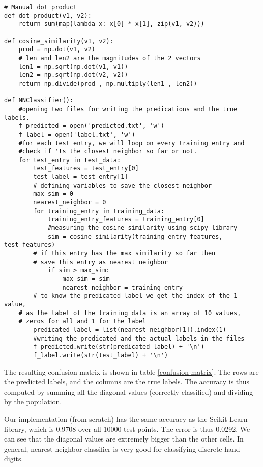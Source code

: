 \begin{lstlisting}[frame=single]
# Manual dot product
def dot_product(v1, v2):
    return sum(map(lambda x: x[0] * x[1], zip(v1, v2)))

def cosine_similarity(v1, v2):
    prod = np.dot(v1, v2)
    # len and len2 are the magnitudes of the 2 vectors
    len1 = np.sqrt(np.dot(v1, v1))
    len2 = np.sqrt(np.dot(v2, v2))
    return np.divide(prod , np.multiply(len1 , len2))

def NNClassifier():
    #opening two files for writing the predications and the true labels.
    f_predicted = open('predicted.txt', 'w')
    f_label = open('label.txt', 'w')
    #for each test entry, we will loop on every training entry and 
    #check if 'ts the closest neighbor so far or not.
    for test_entry in test_data:
        test_features = test_entry[0]    
        test_label = test_entry[1]
        # defining variables to save the closest neighbor
        max_sim = 0  
        nearest_neighbor = 0 
        for training_entry in training_data:
            training_entry_features = training_entry[0]
            #measuring the cosine similarity using scipy library
            sim = cosine_similarity(training_entry_features, test_features)
	    # if this entry has the max similarity so far then 
	    # save this entry as nearest neighbor
            if sim > max_sim: 
                max_sim = sim 
                nearest_neighbor = training_entry
        # to know the predicated label we get the index of the 1 value, 
	# as the label of the training data is an array of 10 values, 
	# zeros for all and 1 for the label      
        predicated_label = list(nearest_neighbor[1]).index(1)
        #writing the predicated and the actual labels in the files
        f_predicted.write(str(predicated_label) + '\n')
        f_label.write(str(test_label) + '\n')
\end{lstlisting}

The resulting confusion matrix is shown in table \ref{confusion-matrix}. The rows are the predicted labels, and the columns are the true labels. The accuracy is thus computed by summing all the diagonal values (correctly classified) and dividing by the population.

Our implementation (from scratch) has the same accuracy as the Scikit Learn library, which is 0.9708 over all 10000 test points. The error is thus 0.0292. We can see that the diagonal values are extremely bigger than the other cells. In general, nearest-neighbor classifier is very good for classifying discrete hand digits. 

